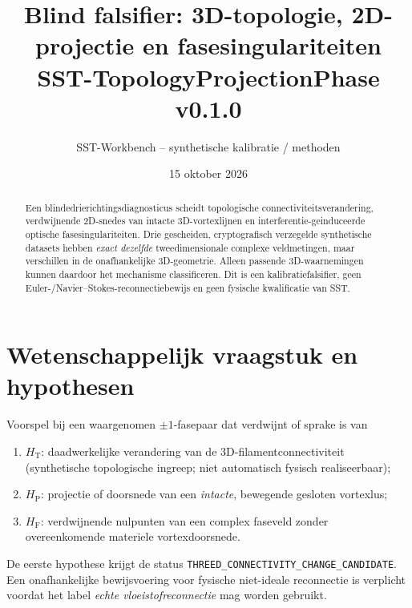 \documentclass[11pt,a4paper]{article}
\title{\textbf{Blind falsifier: 3D-topologie, 2D-projectie en fasesingulariteiten}\\
\large SST-TopologyProjectionPhase v0.1.0}
\author{SST-Workbench -- synthetische kalibratie / methoden}
\date{15 oktober 2026}
\begin{document}
\maketitle
\begin{abstract}
Een blindedrierichtingsdiagnosticus scheidt topologische connectiviteitsverandering,
verdwijnende 2D-snedes van intacte 3D-vortexlijnen en interferentie-geinduceerde
optische fasesingulariteiten. Drie gescheiden, cryptografisch verzegelde
synthetische datasets hebben \emph{exact dezelfde} tweedimensionale complexe veldmetingen,
maar verschillen in de onafhankelijke 3D-geometrie. Alleen passende 3D-waarnemingen
kunnen daardoor het mechanisme classificeren. Dit is een kalibratiefalsifier, geen
Euler-/Navier--Stokes-reconnectiebewijs en geen fysische kwalificatie van SST.
\end{abstract}

\section{Wetenschappelijk vraagstuk en hypothesen}
Voorspel bij een waargenomen $\pm1$-fasepaar dat verdwijnt of sprake is van
\begin{enumerate}
\item $H_{\mathrm{T}}$: daadwerkelijke verandering van de 3D-filamentconnectiviteit
      (synthetische topologische ingreep; niet automatisch fysisch realiseerbaar);
\item $H_{\mathrm{P}}$: projectie of doorsnede van een \emph{intacte}, bewegende gesloten vortexlus;
\item $H_{\mathrm{F}}$: verdwijnende nulpunten van een complex faseveld zonder overeenkomende
      materiele vortexdoorsnede.
\end{enumerate}
De eerste hypothese krijgt de status \texttt{THREED\_CONNECTIVITY\_CHANGE\_CANDIDATE}.
Een onafhankelijke bewijsvoering voor fysische niet-ideale reconnectie is verplicht
voordat het label \emph{echte vloeistofreconnectie} mag worden gebruikt.
\end{document}
